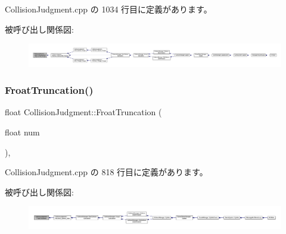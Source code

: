  Collision\+Judgment.\+cpp の 1034 行目に定義があります。

被呼び出し関係図\+:
\nopagebreak
\begin{figure}[H]
\begin{center}
\leavevmode
\includegraphics[width=350pt]{class_collision_judgment_a663c13a9729109b140b9ab6e022fd469_icgraph}
\end{center}
\end{figure}
\mbox{\label{class_collision_judgment_a76fe4aa5e6400073823c1f60395c1f94}} 
\subsubsection{\texorpdfstring{Froat\+Truncation()}{FroatTruncation()}}
{\footnotesize\ttfamily float Collision\+Judgment\+::\+Froat\+Truncation (\begin{DoxyParamCaption}\item[{float}]{num }\end{DoxyParamCaption})\hspace{0.3cm}{\ttfamily [static]}, {\ttfamily [private]}}



 Collision\+Judgment.\+cpp の 818 行目に定義があります。

被呼び出し関係図\+:
\nopagebreak
\begin{figure}[H]
\begin{center}
\leavevmode
\includegraphics[width=350pt]{class_collision_judgment_a76fe4aa5e6400073823c1f60395c1f94_icgraph}
\end{center}
\end{figure}
\mbox{\label{class_collision_judgment_a95962556f370a964ec1961b1c461ae2a}} 
